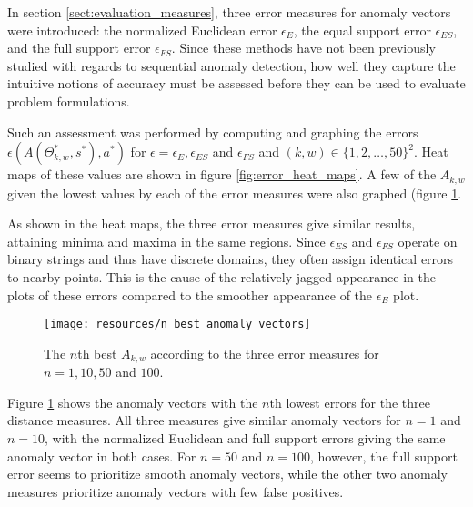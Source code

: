 In section \ref{sect:evaluation_measures}, three error measures for anomaly vectors were introduced: the normalized Euclidean error $\epsilon_E$, the equal support error $\epsilon_{ES}$, and the full support error $\epsilon_{FS}$. Since these methods have not been previously studied with regards to sequential anomaly detection, how well they capture the intuitive notions of accuracy must be assessed before they can be used to evaluate problem formulations.

Such an assessment was performed by computing and graphing the errors $\epsilon(A(\Theta_{k, w}^*, s^*), a^*)$ for $\epsilon = \epsilon_E, \epsilon_{ES}$ and $\epsilon_{FS}$ and $(k, w) \in \{1,2,\dots,50\}^2$. Heat maps of these values are shown in figure \ref{fig:error_heat_maps}. A few of the $A_{k, w}$ given the lowest values by each of the error measures were also graphed (figure \ref{fig:n_best_anomaly_vectors}.

As shown in the heat maps, the three error measures give similar results, attaining minima and maxima in the same regions. Since $\epsilon_{ES}$ and $\epsilon_{FS}$ operate on binary strings and thus have discrete domains, they often assign identical errors to nearby points. This is the cause of the relatively jagged appearance in the plots of these errors compared to the smoother appearance of the $\epsilon_{E}$ plot.

\begin{figure}[ht]
    \vspace{-5pt}
    \begin{center}
        \texttt{[image: resources/n\_best\_anomaly\_vectors]}
    \end{center}
    \vspace{-20pt}
    \caption{\small{The $n$th best $A_{k, w}$ according to the three error measures for $n = 1, 10, 50$ and $100$.}}
    \label{fig:n_best_anomaly_vectors}
    \vspace{-10pt}
\end{figure}

Figure \ref{fig:n_best_anomaly_vectors} shows the anomaly vectors with the $n$th lowest errors for the three distance measures. All three measures give similar anomaly vectors for $n = 1$ and $n = 10$, with the normalized Euclidean and full support errors giving the same anomaly vector in both cases. For $n = 50$ and $n = 100$, however, the full support error seems to prioritize smooth anomaly vectors, while the other two anomaly measures prioritize anomaly vectors with few false positives.

